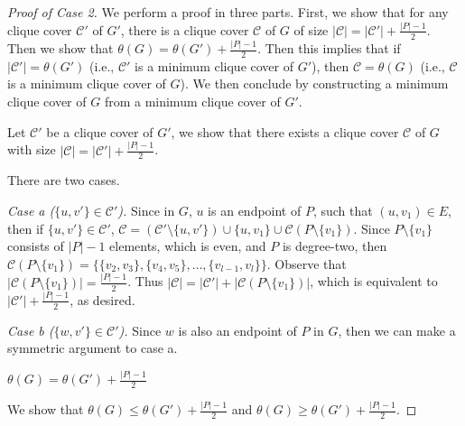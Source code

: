 \documentclass[../techreport.tex]{subfiles}
\begin{document}
\begin{proof}[Proof of Case 2]
	We perform a proof in three parts. First, we show that for any clique cover $\mathcal{C'}$ of $G'$, there is a clique cover $\mathcal{C}$ of $G$ of size $|\mathcal{C}| = |\mathcal{C'}| + \frac{|P| - 1}{2}$. Then we show that $\theta(G) = \theta(G') + \frac{|P| - 1}{2}$. Then this implies that if $|\mathcal{C'}| = \theta(G')$ (i.e., $\mathcal{C'}$ is a minimum clique cover of $G'$), then $\mathcal{C} = \theta(G)$ (i.e., $\mathcal{C}$ is a minimum clique cover of $G$). We then conclude by constructing a minimum clique cover of $G$ from a minimum clique cover of $G'$.
	
	\begin{claim}
		Let $\mathcal{C'}$ be a clique cover of $G'$, we show that there exists a clique cover $\mathcal{C}$ of $G$ with size $|\mathcal{C}| = |\mathcal{C'}| + \frac{|P| - 1}{2}$.
	\end{claim}
	There are two cases.

	\noindent\emph{Case a ($\{u, v'\} \in \mathcal{C'}$).} Since in $G$, $u$ is an endpoint of $P$, such that $(u, v_1) \in E$, then if $\{u, v'\} \in \mathcal{C'}$, $\mathcal{C} = (\mathcal{C'} \setminus \{u, v'\}) \cup \{u, v_1\} \cup \mathcal{C}(P \setminus \{v_1\})$. Since $P \setminus \{v_1\}$ consists of $|P| - 1$ elements, which is even, and $P$ is degree-two, then $\mathcal{C}(P \setminus \{v_1\}) = \{\{v_2, v_3\}, \{v_4, v_5\}, \dots, \{v_{l-1}, v_l\}\}$. Observe that $|\mathcal{C}(P \setminus \{v_1\})| = \frac{|P| - 1}{2}$. Thus $|\mathcal{C}| = |\mathcal{C'}| + |\mathcal{C}(P \setminus \{v_1\})|$, which is equivalent to $|\mathcal{C'}| + \frac{|P| - 1}{2}$, as desired.

	\noindent\emph{Case b ($\{w, v'\} \in \mathcal{C'}$).} Since $w$ is also an endpoint of $P$ in $G$, then we can make a symmetric argument to case a.

	\begin{claim}
		$\theta(G) = \theta(G') + \frac{|P| - 1}{2}$
	\end{claim}
	We show that $\theta(G) \leq \theta(G') + \frac{|P| - 1}{2}$ and $\theta(G) \geq \theta(G') + \frac{|P| - 1}{2}$.


\end{proof}
\end{document}
